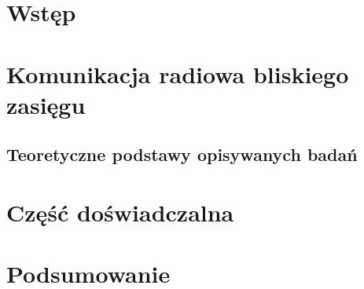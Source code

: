 \chapter{Wstęp}


\chapter{Komunikacja radiowa bliskiego zasięgu}

\section{Teoretyczne podstawy opisywanych badań}



\chapter{Część doświadczalna}


\chapter{Podsumowanie}
\label{ch:podsumowanie}

